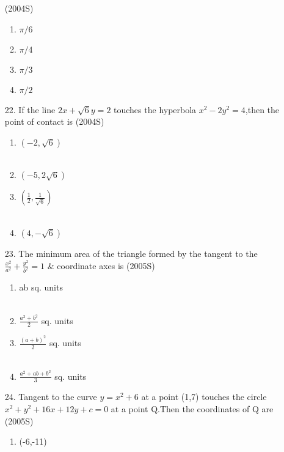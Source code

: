 \documentclass[journal,12pt,twocolumn]{IEEEtran}
\theoremstyle{remark}
\begin{document}
\begin{enumerate}
\hfill{(2004S)}
\begin{multicols}{4}
\begin{enumerate}
    \item $\pi/6$ 
    \item $\pi/4$ 
    \item $\pi/3$
    \item $\pi/2$
\end{enumerate}
\end{multicols}
\item[22.] If the line $2x+\sqrt{6}y=2$ touches the hyperbola $x^{2}-2y^{2}=4$,then the point of contact is \hfill{(2004S)}
\begin{multicols}{2}
\begin{enumerate}
    \item $(-2,\sqrt{6})$\\\\
    \item $(-5,2\sqrt{6})$
    \item $(\frac{1}{2},\frac{1}{\sqrt{6}})$\\\\
    \item $(4,-\sqrt{6})$
\end{enumerate}
\end{multicols}
\item[23.] The minimum area of the triangle formed by the tangent to the $\frac{x^{2}}{a^{2}}+\frac{y^{2}}{b^{2}}=1$ \& coordinate axes is \hfill{(2005S)}
\begin{multicols}{2}
\begin{enumerate}
    \item ab sq. units\\\\
    \item $\frac{a^{2}+b^{2}}{2}$ sq. units
    \item $\frac{(a+b)^{2}}{2}$ sq. units\\\\
    \item $\frac{a^{2}+ab+b^{2}}{3}$ sq. units
\end{enumerate}
\end{multicols}
\item[24.] Tangent to the curve $y=x^{2}+6$ at a point (1,7) touches the circle $x^{2}+y^{2}+16x+12y+c=0$ at a point Q.Then the coordinates of Q are \hfill{(2005S)}
\begin{multicols}{2}
\begin{enumerate}
    \item(-6,-11)\\\\

\end{enumerate}
\end{multicols}
\end{enumerate}
\end{document}
